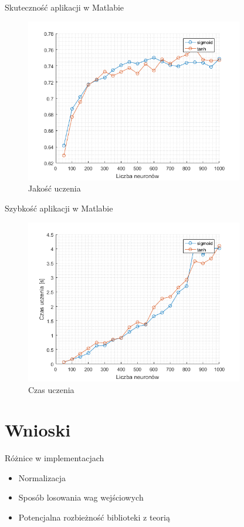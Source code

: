 \documentclass{beamer}
\begin{document}
\begin{frame}{Skuteczność aplikacji w Matlabie}
\begin{figure}[H]
\centering
\includegraphics[width=0.85\textwidth]{forest_liczba_neuronow.png}
\caption{Jakość uczenia}
\end{figure}
\end{frame}

\begin{frame}{Szybkość aplikacji w Matlabie}
\begin{figure}[H]
\centering
\includegraphics[width=0.85\textwidth]{forest_wydajnosc.png}
\caption{Czas uczenia}
\end{figure}
\end{frame}

\section{Wnioski}
\begin{frame}{Różnice w implementacjach}
\begin{itemize}
\item Normalizacja
\item Sposób losowania wag wejściowych
\item Potencjalna rozbieżność biblioteki z teorią
\end{itemize}
\end{frame}
\end{document}
